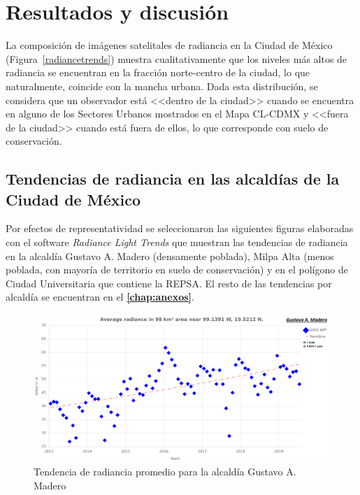 \chapter{Resultados y discusión}

La composición de imágenes satelitales de radiancia en la Ciudad de México (Figura~\ref{radiancetrends}) muestra cualitativamente que los niveles más altos de radiancia se encuentran en la fracción norte-centro de la ciudad, lo que naturalmente, coincide con la mancha urbana. Dada esta distribución, se considera que un observador está <<dentro de la ciudad>> cuando se encuentra en alguno de los Sectores Urbanos mostrados en el Mapa CL-CDMX y <<fuera de la ciudad>> cuando está fuera de ellos, lo que corresponde con suelo de conservación. 

\section{Tendencias de radiancia en las alcaldías de la Ciudad de México}

Por efectos de representatividad se seleccionaron las siguientes figuras elaboradas con el software \textit{Radiance Light Trends} que muestran las tendencias de radiancia en la alcaldía Gustavo A. Madero (densamente poblada), Milpa Alta (menos poblada, con mayoría de territorio en suelo de conservación) y en el polígono de Ciudad Universitaria que contiene la REPSA. El resto de las tendencias por alcaldía se encuentran en el \textbf{\autoref{chap:anexos}}.

\begin{figure}[htb]
  \centering
    \includegraphics[width=1\textwidth]{GAM}
  \caption{Tendencia de radiancia promedio para la alcaldía Gustavo A. Madero}
  \label{radiancetrendsgam}
\end{figure}

\newpage


